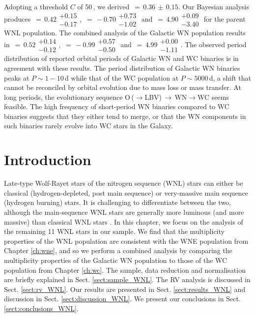\begin{abs}
Adopting a threshold $C$ of 50\,\kms{}, we derived \fobsWNL{}$\,=\,0.36\,\pm\,0.15$. Our Bayesian analysis produces \fintWNL{}$\,=\,0.42\substack{+0.15 \\ -0.17}$, \piWNL{}$\,=\,-0.70\substack{+0.73 \\ -1.02}$ and \logPmaxWNL$\,=\,4.90\substack{+0.09 \\ -3.40}$ for the parent WNL population. The combined analysis of the Galactic WN population results in \fintWN{}$\,=\,0.52\substack{+0.14 \\ -0.12}$, \piWN{}$\,=\,-0.99\substack{+0.57 \\ -0.50}$ and \logPmaxWN$\,=\,4.99\substack{+0.00 \\ -1.11}$. The observed period distribution of reported orbital periods of Galactic WN and WC binaries is in agreement with these results.
The period distribution of Galactic WN binaries peaks at $P{\sim}1-10\,$d while that of the WC population at $P{\sim}5000\,$d, a shift that cannot be reconciled by orbital evolution due to mass loss or mass transfer.
At long periods, the evolutionary sequence O\,($\xrightarrow{}$LBV)\,$\xrightarrow{}$\,WN$\xrightarrow{}$WC seems feasible. The high frequency of short-period WN binaries compared to WC binaries suggests that they either tend to merge, or that the WN components in such binaries rarely evolve into WC stars in the Galaxy.
\end{abs}


\section{Introduction}


Late-type Wolf-Rayet stars of the nitrogen sequence (WNL) stars can either be classical (hydrogen-depleted, post main sequence) or very-massive main sequence (hydrogen burning) stars. It is challenging to differentiate between the two, although the main-sequence WNL stars are generally more luminous (and more massive) than classical WNL stars \citep{hamann_galactic_2019}. In this chapter, we focus on the analysis of the remaining 11 WNL stars in our sample. We find that the multiplicity properties of the WNL population are consistent with the WNE population from Chapter \ref{ch:wne}, and so we perform a combined analysis by comparing the multiplicity properties of the Galactic WN population to those of the WC population from Chapter \ref{ch:wc}. The sample, data reduction and normalisation are briefly explained in Sect. \ref{sect:sample_WNL}. The RV analysis is discussed in Sect. \ref{sect:rv_WNL}. Our results are presented in Sect. \ref{sect:results_WNL} and discussion in Sect. \ref{sect:discussion_WNL}. We present our conclusions in Sect. \ref{sect:conclusions_WNL}.


